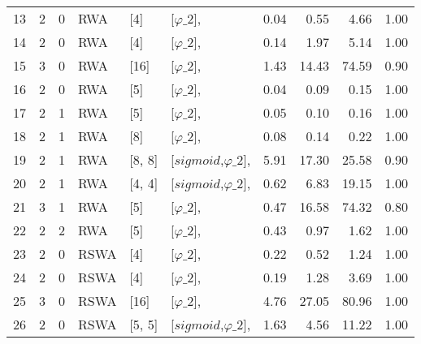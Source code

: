 \begin{tabular}{lrrlllrrrr}
    13 & 2     & 0     & RWA         & [4]     & [$\varphi\_{2}$],                            & 0.04                    & 0.55   & 4.66   & 1.00 \\
    14 & 2     & 0     & RWA         & [4]     & [$\varphi\_{2}$],                            & 0.14                    & 1.97   & 5.14   & 1.00 \\
    15 & 3     & 0     & RWA         & [16]    & [$\varphi\_{2}$],                            & 1.43                    & 14.43  & 74.59  & 0.90 \\
    16 & 2     & 0     & RWA         & [5]     & [$\varphi\_{2}$],                            & 0.04                    & 0.09   & 0.15   & 1.00 \\
    17 & 2     & 1     & RWA         & [5]     & [$\varphi\_{2}$],                            & 0.05                    & 0.10   & 0.16   & 1.00 \\
    18 & 2     & 1     & RWA         & [8]     & [$\varphi\_{2}$],                            & 0.08                    & 0.14   & 0.22   & 1.00 \\
    19 & 2     & 1     & RWA         & [8, 8]  & [$sigmoid$,$\varphi\_{2}$],                  & 5.91                    & 17.30  & 25.58  & 0.90 \\
    20 & 2     & 1     & RWA         & [4, 4]  & [$sigmoid$,$\varphi\_{2}$],                  & 0.62                    & 6.83   & 19.15  & 1.00 \\
    21 & 3     & 1     & RWA         & [5]     & [$\varphi\_{2}$],                            & 0.47                    & 16.58  & 74.32  & 0.80 \\
    22 & 2     & 2     & RWA         & [5]     & [$\varphi\_{2}$],                            & 0.43                    & 0.97   & 1.62   & 1.00 \\
    23 & 2     & 0     & RSWA        & [4]     & [$\varphi\_{2}$],                            & 0.22                    & 0.52   & 1.24   & 1.00 \\
    24 & 2     & 0     & RSWA        & [4]     & [$\varphi\_{2}$],                            & 0.19                    & 1.28   & 3.69   & 1.00 \\
    25 & 3     & 0     & RSWA        & [16]    & [$\varphi\_{2}$],                            & 4.76                    & 27.05  & 80.96  & 1.00 \\
    26 & 2     & 0     & RSWA        & [5, 5]  & [$sigmoid$,$\varphi\_{2}$],                  & 1.63                    & 4.56   & 11.22  & 1.00 \\

\end{tabular}
